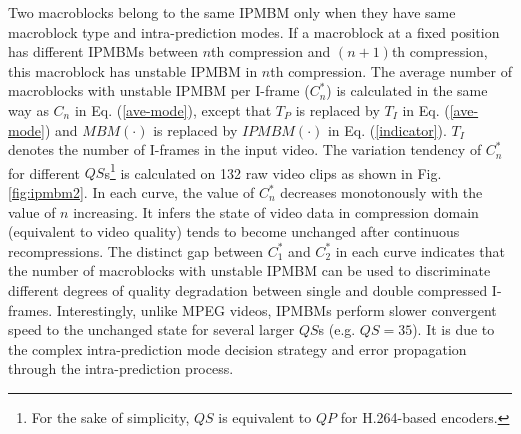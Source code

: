 \documentclass[journal,sort]{IEEEtran}
\begin{document}
Two macroblocks belong to the same IPMBM only when they have same macroblock type and intra-prediction modes. If a macroblock at a fixed position has different IPMBMs between $n$th compression and $(n+1)$th compression, this macroblock has unstable IPMBM in $n$th compression. The average number of macroblocks with unstable IPMBM per I-frame ($C^*_n$) is calculated in the same way as $C_n$ in Eq. (\ref{ave-mode}), except that $T_P$ is replaced by $T_I$ in Eq. (\ref{ave-mode}) and $MBM(\cdot)$ is replaced by $IPMBM(\cdot)$ in Eq. (\ref{indicator}). $T_I$ denotes the number of I-frames in the input video. The variation tendency of $C^*_n$ for different $QS$s\footnote{For the sake of simplicity, $QS$ is equivalent to $QP$ for H.264-based encoders.} is calculated on 132 raw video clips as shown in Fig. \ref{fig:ipmbm2}. In each curve, the value of $C^*_n$ decreases monotonously with the value of $n$ increasing. It infers the state of video data in compression domain (equivalent to video quality) tends to become unchanged after continuous recompressions. The distinct gap between $C^*_1$ and $C^*_2$ in each curve indicates that the number of macroblocks with unstable IPMBM can be used to discriminate different degrees of quality degradation between single and double compressed I-frames. Interestingly, unlike MPEG videos, IPMBMs perform slower convergent speed to the unchanged state for several larger $QS$s (e.g. $QS=35$). It is due to the complex intra-prediction mode decision strategy and error propagation through the intra-prediction process. 
 
\end{document}
